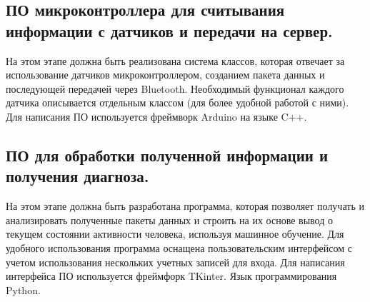 \documentclass[a4document]{article}
\begin{document}
{{}

\subsection*{ПО микроконтроллера для считывания информации с датчиков и передачи на сервер.}
{
На этом этапе должна быть реализована система классов, которая отвечает за использование датчиков микроконтроллером, 
созданием пакета данных и последующей передачей через Bluetooth. Необходимый функционал каждого датчика описывается 
отдельным классом (для более удобной работой с ними). Для написания ПО используется фреймворк Arduino на языке C++.

}

\subsection*{ПО для обработки полученной информации и получения диагноза.}
{
На этом этапе должна быть разработана программа, которая позволяет получать и анализировать полученные пакеты данных и строить
на их основе вывод о текущем состоянии активности человека, используя машинное обучение. Для удобного использования
программа оснащена пользовательским интерфейсом с учетом использования нескольких учетных записей для входа. 
Для написания интерфейса ПО используется фреймфорк TKinter. Язык программирования Python.

}

}
\end{document}
